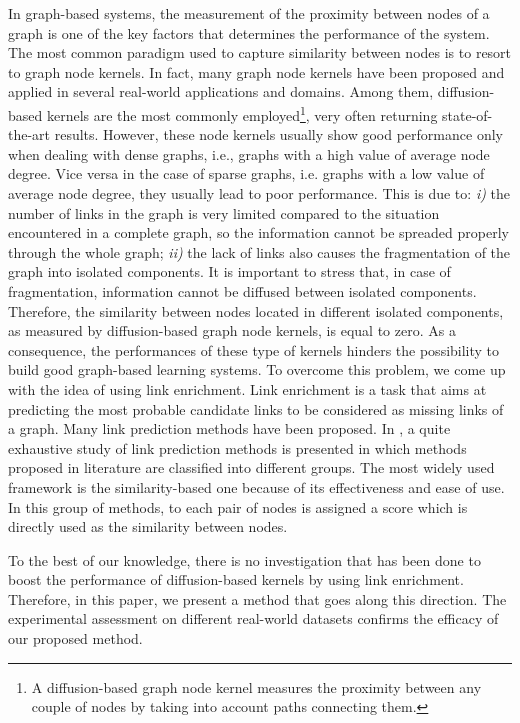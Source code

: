 \documentclass[runningheads,a4paper]{llncs}
\begin{document}
In graph-based systems, the measurement of the proximity between nodes of a graph is one of the key factors that determines the performance of the system. The most common paradigm used to capture similarity between nodes is to resort to graph node kernels. In fact, many  graph node kernels have been proposed and applied in several real-world applications and domains. Among them, diffusion-based kernels \cite{proceeding2} are the most commonly employed\footnote{A diffusion-based graph node kernel measures the proximity between any couple of nodes by taking into account paths connecting them.}, very often returning state-of-the-art results. However, these node kernels usually show good performance only when dealing with dense graphs, i.e., graphs with a high value of average node degree. Vice versa in the case of sparse graphs, i.e. graphs with a low value of average node degree, they usually lead to poor performance. This is due to: {\it i)} the number of links in the graph is very limited compared to the situation encountered in a complete graph, so the information cannot be spreaded properly through the whole graph; {\it ii)} the lack of links also causes the fragmentation of the graph into isolated components. It is important to stress that, in case of fragmentation, information cannot be diffused between isolated components. Therefore, the similarity between nodes located in different isolated components, as measured by diffusion-based graph node kernels, is equal to zero. As a consequence, the performances of these type of kernels hinders the possibility to build good graph-based learning systems. To overcome this problem, we come up with the idea of using link enrichment. Link enrichment is a task that aims at predicting the most probable candidate links to be considered as missing links of a graph. Many link prediction methods have been proposed. In \cite{jour2}, a quite exhaustive study of link prediction methods is presented in which methods proposed in literature are classified into different groups. The most widely used framework is the similarity-based one because of its effectiveness and ease of use. In this group of methods, to each pair of nodes is assigned a score which is directly used as the similarity between nodes.

To the best of our knowledge, there is no investigation that has been done to boost the performance of diffusion-based kernels by using link enrichment. Therefore, in this paper, we present a method that goes along this direction.
The experimental assessment  on different real-world datasets confirms the efficacy of our proposed method.
\end{document}
